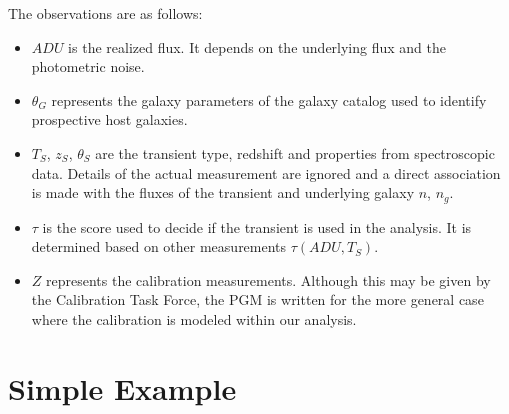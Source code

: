 \documentclass[preprint]{aastex}
\begin{document}
The observations are as follows:
\begin{itemize}
\item ${\mathit{ADU}}$ is the realized flux.  It depends on the underlying flux and
the photometric noise.
\item $\theta_G$ represents the galaxy parameters of the
galaxy catalog used to identify prospective host galaxies.
\item ${T}_S$, ${z}_S$, ${\theta}_S$ are the transient type, redshift and properties from
spectroscopic data. Details of the actual measurement are ignored and a direct association
is made with the fluxes of the transient and underlying galaxy $n$, $n_g$.
\item $\tau$ is the score used to decide if the transient is used in the analysis.  It is
determined based on other measurements $\tau(\mathit{ADU},T_S)$.
\item ${Z}$ represents the calibration measurements.   Although this may be given
by the Calibration Task Force, the PGM is written for the more general case where the calibration
is modeled within our analysis.
\end{itemize}


\section{Simple Example}
\end{document}
